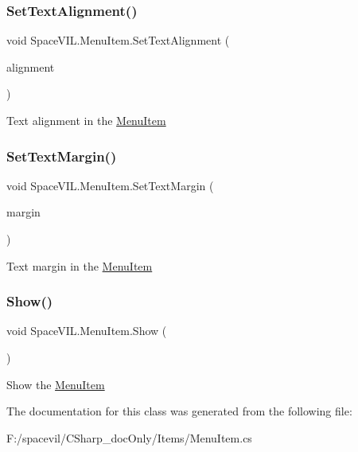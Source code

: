 \subsubsection{\texorpdfstring{Set\+Text\+Alignment()}{SetTextAlignment()}}
{\footnotesize\ttfamily void Space\+V\+I\+L.\+Menu\+Item.\+Set\+Text\+Alignment (\begin{DoxyParamCaption}\item[{Item\+Alignment}]{alignment }\end{DoxyParamCaption})}



Text alignment in the \mbox{\hyperlink{class_space_v_i_l_1_1_menu_item}{Menu\+Item}} 

\mbox{\label{class_space_v_i_l_1_1_menu_item_a91be48e8848efeafce18980725031e09}} 
\subsubsection{\texorpdfstring{Set\+Text\+Margin()}{SetTextMargin()}}
{\footnotesize\ttfamily void Space\+V\+I\+L.\+Menu\+Item.\+Set\+Text\+Margin (\begin{DoxyParamCaption}\item[{\mbox{\hyperlink{struct_space_v_i_l_1_1_decorations_1_1_indents}{Indents}}}]{margin }\end{DoxyParamCaption})}



Text margin in the \mbox{\hyperlink{class_space_v_i_l_1_1_menu_item}{Menu\+Item}} 

\mbox{\label{class_space_v_i_l_1_1_menu_item_a6580890d0efc3f2a6f075d7a4ac71b1d}} 
\subsubsection{\texorpdfstring{Show()}{Show()}}
{\footnotesize\ttfamily void Space\+V\+I\+L.\+Menu\+Item.\+Show (\begin{DoxyParamCaption}{ }\end{DoxyParamCaption})}



Show the \mbox{\hyperlink{class_space_v_i_l_1_1_menu_item}{Menu\+Item}} 



The documentation for this class was generated from the following file\+:\begin{DoxyCompactItemize}
\item 
F\+:/spacevil/\+C\+Sharp\+\_\+doc\+Only/\+Items/Menu\+Item.\+cs\end{DoxyCompactItemize}
